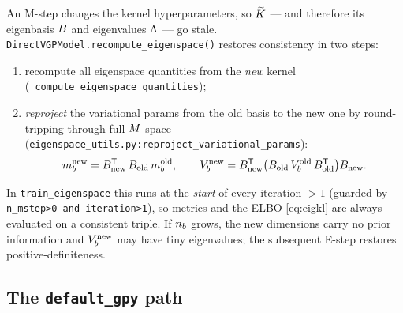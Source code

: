 An M-step changes the kernel hyperparameters, so $\widetilde{K}$ --- and therefore its
eigenbasis $B$ and eigenvalues $\Lambda$ --- go stale.
\texttt{DirectVGPModel.recompute\_eigenspace()} restores consistency in two steps:
\begin{enumerate}[nosep]
  \item recompute all eigenspace quantities from the \emph{new} kernel
    (\texttt{\_compute\_eigenspace\_quantities});
  \item \emph{reproject} the variational params from the old basis to the new one
    by round-tripping through full $M$-space
    (\texttt{eigenspace\_utils.py:\allowbreak reproject\_variational\_params}):
    \begin{equation}
      m_{b}^{\text{new}}=B_{\text{new}}^{\mathsf{T}}\,B_{\text{old}}\,m_{b}^{\text{old}},
      \qquad
      V_{b}^{\text{new}}=B_{\text{new}}^{\mathsf{T}}\big(B_{\text{old}}\,V_{b}^{\text{old}}\,B_{\text{old}}^{\mathsf{T}}\big)B_{\text{new}}.
      \label{eq:reproject}
    \end{equation}
\end{enumerate}
In \texttt{train\_eigenspace} this runs at the \emph{start} of every iteration
$>1$ (guarded by \texttt{n\_mstep>0 and iteration>1}), so metrics and the ELBO
\eqref{eq:eigkl} are always evaluated on a consistent triple. If $n_{b}$ grows, the
new dimensions carry no prior information and $V_{b}^{\text{new}}$ may have tiny
eigenvalues; the subsequent E-step restores positive-definiteness.


\subsection{The \texttt{default\_gpy} path}\label{sec:defaultgpy}

